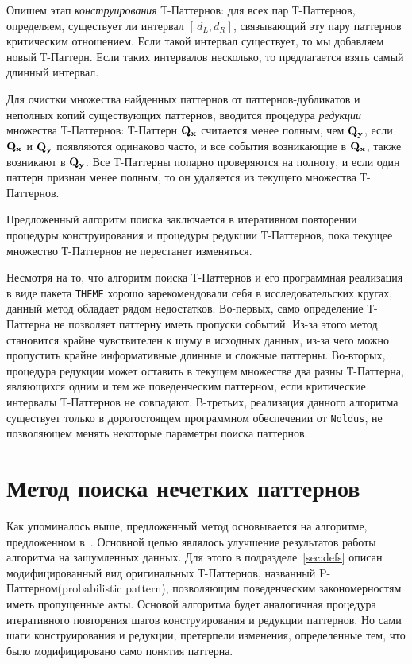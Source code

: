 \documentclass[12pt,fсeqn]{article}
\begin{document}
Опишем этап {\em конструирования} Т-Паттернов: для всех пар Т-Паттернов, определяем, 
существует ли интервал $[\,d_L, d_R]$, связывающий эту пару паттернов критическим отношением. 
Если такой интервал существует, то мы добавляем новый Т-Паттерн. Если таких интервалов несколько,
то предлагается взять самый длинный интервал.

Для очистки множества найденных паттернов от паттернов-дубликатов и неполных копий существующих паттернов,
вводится процедура {\em редукции} множества Т-Паттернов: Т-Паттерн ${\bf Q_x}$ считается менее полным, чем ${\bf Q_y}$, 
если ${\bf Q_x}$ и ${\bf Q_y}$ появляются одинаково часто, и все события
возникающие в ${\bf Q_x}$, также возникают в ${\bf Q_y}$. Все Т-Паттерны попарно проверяются на полноту,
и если один паттерн признан менее полным, то он удаляется из текущего множества Т-Паттернов.

Предложенный алгоритм поиска заключается в итеративном повторении процедуры конструирования и процедуры редукции 
Т-Паттернов, пока текущее множество Т-Паттернов не перестанет изменяться. 

Несмотря на то, что алгоритм поиска Т-Паттернов и его программная
реализация в виде пакета \verb!THEME! хорошо зарекомендовали себя в исследовательских кругах, данный 
метод обладает рядом недостатков. Во-первых, само определение Т-Паттерна не позволяет паттерну иметь 
пропуски событий. Из-за этого метод становится крайне чувствителен к шуму в исходных данных, из-за чего
можно пропустить крайне информативные длинные и сложные паттерны. Во-вторых, процедура редукции
может оставить в текущем множестве два разны Т-Паттерна, являющихся одним и тем же поведенческим паттерном, если 
критические интервалы Т-Паттернов не совпадают. В-третьих, реализация данного алгоритма существует только
в дорогостоящем программном обеспечении от \verb!Noldus!, не позволяющем менять некоторые параметры поиска паттернов.

\section{Метод поиска нечетких паттернов}
Как упоминалось выше, предложенный метод основывается на алгоритме, предложенном в~\cite{Magnusson}. Основной целью 
являлось улучшение результатов работы алгоритма на зашумленных данных. Для этого в подразделе~\ref{sec:defs} описан модифицированный вид оригинальных Т-Паттернов,
названный P-Паттерном(probabilistic pattern), позволяющим поведенческим закономерностям  иметь пропущенные акты. Основой алгоритма будет 
аналогичная процедура итеративного повторения шагов конструирования и редукции паттернов. Но сами шаги 
конструирования и редукции, претерпели изменения, определенные тем, что было модифицировано само понятия паттерна.
\end{document}
